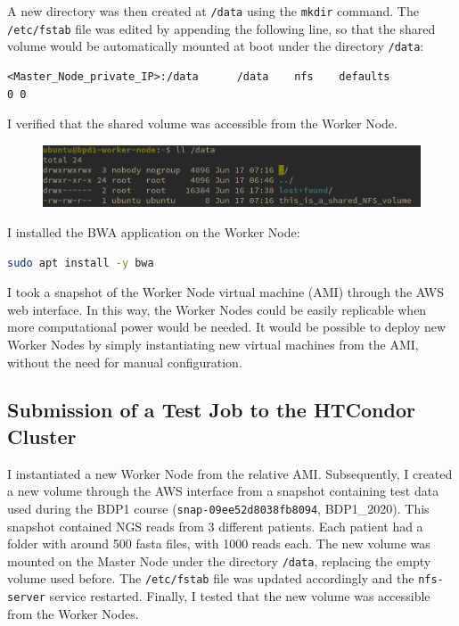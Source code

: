 \documentclass{article}
\begin{document}
A new directory was then created at \texttt{/data} using the \texttt{mkdir} command.
The \texttt{/etc/fstab} file was edited by appending the following line, so that the shared volume would be automatically mounted at boot under the directory \texttt{/data}:

\begin{lstlisting}
<Master_Node_private_IP>:/data      /data    nfs    defaults                0 0
\end{lstlisting}

I verified that the shared volume was accessible from the Worker Node.

\begin{figure}[!h]
    \center%
    \includegraphics[width=\textwidth]{./images/nfs_works.png}
\end{figure}

I installed the BWA application on the Worker Node:

\begin{lstlisting}[language=bash]
sudo apt install -y bwa
\end{lstlisting}

I took a snapshot of the Worker Node virtual machine (AMI) through the AWS web interface.
In this way, the Worker Nodes could be easily replicable when more computational power would be needed.
It would be possible to deploy new Worker Nodes by simply instantiating new virtual machines from the AMI, without the need for manual configuration.

\subsection{Submission of a Test Job to the HTCondor Cluster}
I instantiated a new Worker Node from the relative AMI\@.
Subsequently, I created a new volume through the AWS interface from a snapshot containing test data used during the BDP1 course (\texttt{snap-09ee52d8038fb8094}, BDP1\_2020).
This snapshot contained NGS reads from 3 different patients.
Each patient had a folder with around 500 fasta files, with 1000 reads each.
The new volume was mounted on the Master Node under the directory \texttt{/data}, replacing the empty volume used before.
The \texttt{/etc/fstab} file was updated accordingly and the \texttt{nfs-server} service restarted.
Finally, I tested that the new volume was accessible from the Worker Nodes.
\end{document}
